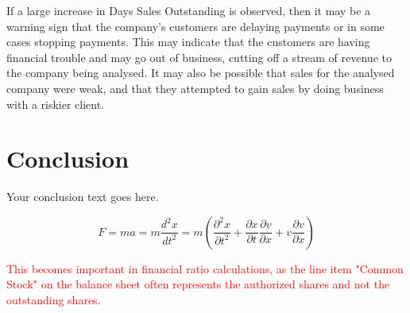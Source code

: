 \documentclass{article}
\begin{document}
If a large increase in Days Sales Outstanding is observed, then it may be a warning sign that the company's customers are delaying payments or in some cases stopping payments. This may indicate that the customers are having financial trouble and may go out of business, cutting off a stream of revenue to the company being analysed. It may also be possible that sales for the analysed company were weak, and that they attempted to gain sales by doing business with a riskier client. 

















\section{Conclusion}

Your conclusion text goes here.


\begin{equation}
    F = ma = m\frac{d^2x}{dt^2} = m\left(\frac{\partial^2x}{\partial t^2} + \frac{\partial x}{\partial t}\frac{\partial v}{\partial x} + v\frac{\partial v}{\partial x}\right)
\end{equation}

\textcolor{red}{This becomes important in financial ratio calculations, as the line item "Common Stock" on the balance sheet often represents the authorized shares and not the outstanding shares.}
\end{document}
